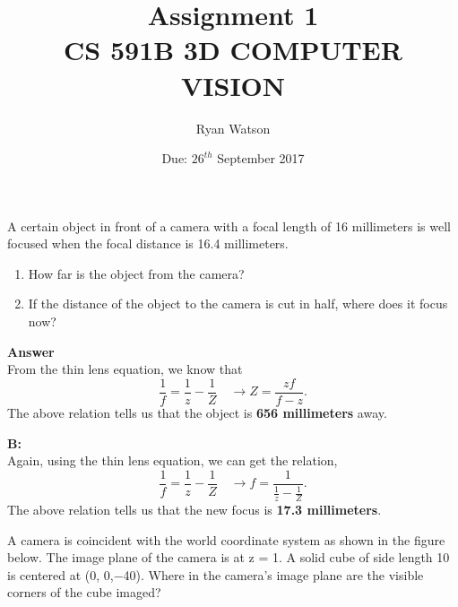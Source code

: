 \documentclass[12pt, letterpaper]{article}
\title{Assignment 1 \\ CS 591B 3D COMPUTER VISION}
\author{Ryan Watson }
\date{Due: $26^{th}$ September 2017}
\begin{document}
 
\begin{titlepage}
\clearpage\maketitle
\thispagestyle{empty}
\end{titlepage}


 \hspace{0.4cm} A certain object in front of a camera with a focal length of 16 millimeters is well focused when the focal distance is 16.4 millimeters.
 
\begin{enumerate}[label=\Alph*]
 	\item How far is the object from the camera?
 	\item If the distance of the object to the camera is cut in half, where does it focus now?
\end{enumerate} 

{\bf{ Answer \\}}
\indent From the thin lens equation, we know that 
\begin{equation*}
\frac{1}{f} = \frac{1}{z} - \frac{1}{Z} \quad \rightarrow Z = \frac{zf}{f-z}.
\end{equation*}
\indent The above relation tells us that the object is {\bf{656 millimeters}} away.

\vspace{0.2cm}
{\bf{B: \\}}
\indent Again, using the thin lens equation, we can get the relation, 
\begin{equation*}
\frac{1}{f} = \frac{1}{z} - \frac{1}{Z} \quad \rightarrow f = \frac{1}{\frac{1}{z} - \frac{1}{Z}}.
\end{equation*}
\indent The above relation tells us that the new focus is {\bf{17.3 millimeters}}.



\vspace{1.5cm}
 \hspace{0.4cm} A camera is coincident with the world coordinate system as shown in the figure below. The image plane of the camera is at z = 1. A solid cube of side length 10
is centered at (0, 0,−40). Where in the camera's image plane are the visible corners of the cube
imaged?
\end{document}
